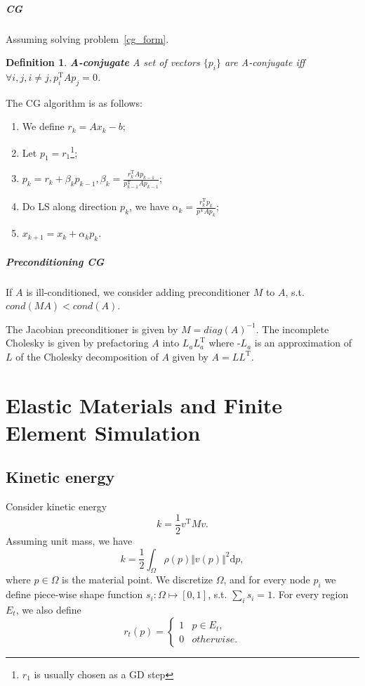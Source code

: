 \documentclass{fancydoc}
\newtheorem{mydef}{Definition}
\newcommand{\trans}{\mathrm{T}}
\newcommand{\diffd}{\mathrm{d}}
\begin{document}
\subparagraph{CG}
Assuming solving problem~\eqref{cg_form}.
\begin{mydef}
	\textbf{A-conjugate} A set of vectors $\{p_i\}$ are A-conjugate iff $\forall  i, j, i\neq j, p_i^\trans Ap_j = 0$.
\end{mydef}
The CG algorithm is as follows:
\begin{enumerate}
	\item We define $r_k = Ax_k - b$;
	\item Let $p_1 = r_1$\footnote{$r_1$ is usually chosen as a GD step};
	\item $p_k = r_k + \beta_k p_{k-1}, \beta_k = \frac{r_k^\trans Ap_{k-1}}{p_{k-1}^\trans Ap_{k-1}}$;
	\item Do LS along direction $p_k$, we have $\alpha_k = \frac{r_k^\trans p_k}{p^\trans A p_k}$;
	\item $x_{k+1} = x_k + \alpha_k p_k$.
\end{enumerate}

\subparagraph{Preconditioning CG}
If $A$ is ill-conditioned, we consider adding preconditioner $M$ to $A$, s.t. $cond(MA) < cond(A)$.

The Jacobian preconditioner is given by $M = diag(A)^{-1}$. The incomplete Cholesky is given by prefactoring $A$ into $L_a L_a^\trans$ where -$L_a$ is an approximation of $L$ of the Cholesky decomposition of $A$ given by $A=LL^\trans$.

\section{Elastic Materials and Finite Element Simulation}
\subsection{Kinetic energy}
Consider kinetic energy 
\begin{equation*}
k = \frac{1}{2} v^\trans Mv.
\end{equation*}
Assuming unit mass, we have
\begin{equation}
k = \frac{1}{2} \int_\Omega \rho(p) \Vert v(p) \Vert^2 \diffd p,
\end{equation}
where $p \in \Omega$ is the material point. We discretize $\Omega$, and for every node $p_i$ we define piece-wise shape function $s_i : \Omega \mapsto [0, 1]$, s.t. $\sum_i s_i = 1$. For every region $E_t$, we also define
\[r_t(p) = \begin{cases}
1 & p\in E_t,\\
0 & otherwise.
\end{cases} 
\]
\end{document}
